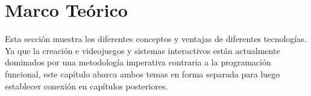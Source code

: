 \documentclass[letterpaper,12pt,times,oneside,numbered,print,index,custommargin,PageStyleI]{Classes/PhDThesisPSnPDF}
\begin{document}

\tableofcontents

\listoffigures

\listoftables


\printnomenclature

\mainmatter



\chapter{Marco Teórico}
\label{capitulo2}

Esta sección muestra los diferentes conceptos y ventajas de diferentes tecnologías. Ya que la creación e videojuegos y sistemas interactivos están actualmente dominados por una metodología imperativa contraria a la programación funcional, este capítulo abarca ambos temas en forma separada para luego establecer conexión en capítulos posteriores.









%
%
%
%
%
%
%




\begin{spacing}{0.9}


%

\cleardoublepage





\end{spacing}
\end{document}
